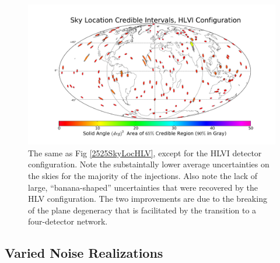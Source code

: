 \documentclass[11pt,a4paper]{emulateapj} 
\begin{document}
\begin{figure}[ht!]
  \centering \includegraphics[angle=0,scale=0.4, trim=5cm 2cm 3cm
    0cm]{HLVIsky.pdf}
 \caption{The same as Fig \ref{2525SkyLocHLV}, except for the HLVI
   detector configuration.  Note the substaintally lower average
   uncertainties on the skies for the majority of the injections.
   Also note the lack of large, ``banana-shaped'' uncertainties that
   were recovered by the HLV configuration.  The two improvements are
   due to the breaking of the plane degeneracy that
   is facilitated by the transition to a four-detector network.}
 \label{2525SkyLocHLVI}
\end{figure}
  

\subsection{Varied Noise Realizations}
\label{noiseSection}
\end{document}
